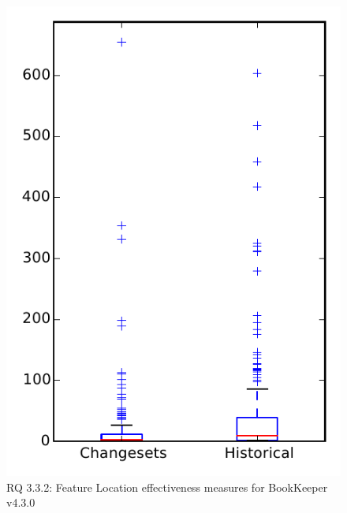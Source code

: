 
\begin{figure}
\centering
\includegraphics[height=0.4\textheight]{figures/flt/rq2_bookkeeper}
\caption{RQ 3.3.2: Feature Location effectiveness measures for BookKeeper v4.3.0}
\label{fig:flt:rq2:bookkeeper}
\end{figure}
